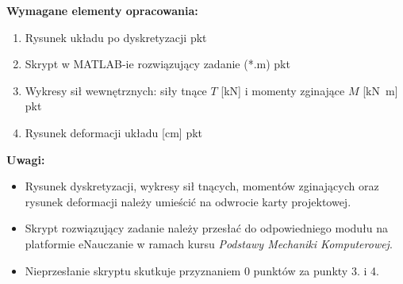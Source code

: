 \documentclass[a4paper,10pt]{article}
\begin{document}
    \vspace{5mm}

    \noindent\textbf{Wymagane elementy opracowania:}

    \begin{enumerate}
    \item Rysunek układu po dyskretyzacji  pkt
    \item Skrypt w MATLAB-ie rozwiązujący zadanie (*.m)  pkt
    \item Wykresy sił wewnętrznych: siły tnące \(T\) [\si{\kilo\newton}] i momenty zginające \(M\) [\si{\kilo\newton m}]  pkt
    \item Rysunek deformacji układu [\si{\centi\meter}]  pkt
    \end{enumerate}

    \vspace{5mm}

    \noindent\textbf{Uwagi:}
    \begin{itemize}
    \item Rysunek dyskretyzacji, wykresy sił tnących, momentów zginających oraz rysunek deformacji należy umieścić na odwrocie karty projektowej.
    \item Skrypt rozwiązujący zadanie należy przesłać do odpowiedniego modułu na platformie eNauczanie w ramach kursu \textit{Podstawy Mechaniki Komputerowej}.
    \item Nieprzesłanie skryptu skutkuje przyznaniem 0 punktów za punkty 3. i 4.
    \end{itemize}
\end{document}
